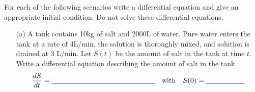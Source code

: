 

\begin{problem}
    For each of the following scenarios write a differential equation and give an
appropriate initial condition.  Do not solve these differential
equations.
\begin{enumerate}
    \item[(a)] A tank contains 10kg of salt and 2000L of water.  Pure water enters the tank
    at a rate of 4L/min, the solution is thoroughly mixed, and solution is drained at 3
    L/min.  Let $S(t)$ be the amount of salt in the tank at time $t$.  Write a
    differential equation describing the amount of salt in the tank.
    \[ \frac{dS}{dt} = \underline{\hspace{2in}} \quad \text{with} \quad S(0) =
        \underline{\hspace{0.75in}} \]
        \solution{
            \[ \frac{dS}{dt} = -\frac{3S}{2000+1t} \quad \text{with} \quad S(0) = 10 \]
        }


\end{enumerate}
\end{problem}
